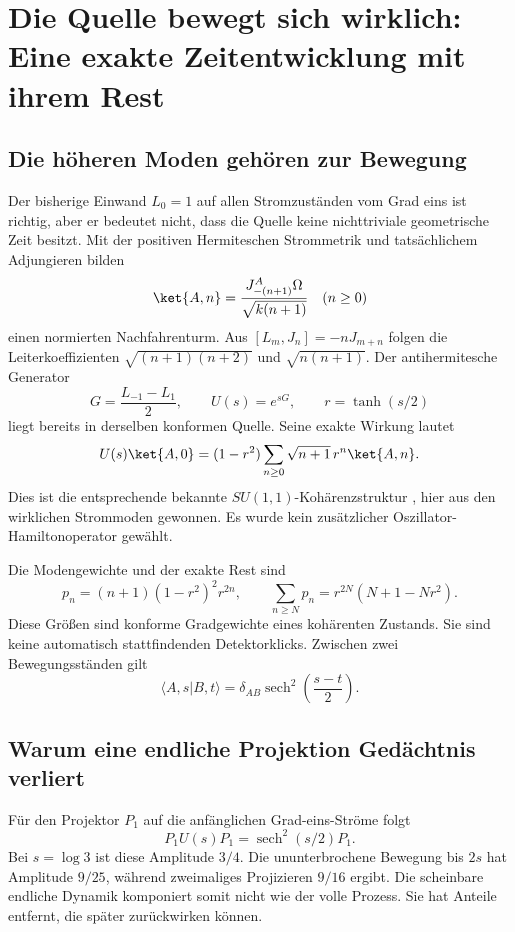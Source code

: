 \section{Die Quelle bewegt sich wirklich: Eine exakte Zeitentwicklung mit ihrem Rest}\label{sec:mobius}

\subsection{Die höheren Moden gehören zur Bewegung}
Der bisherige Einwand $L_0=1$ auf allen Stromzuständen vom Grad eins ist richtig, aber er bedeutet nicht, dass die Quelle keine nichttriviale geometrische Zeit besitzt. Mit der positiven Hermiteschen Strommetrik und tatsächlichem Adjungieren bilden
\begin{equation}
\ket{A,n}=\frac{J_{-(n+1)}^A\Omega}{\sqrt{k(n+1)}}\quad(n\ge0)
\end{equation}
einen normierten Nachfahrenturm. Aus $[L_m,J_n]=-nJ_{m+n}$ folgen die Leiterkoeffizienten $\sqrt{(n+1)(n+2)}$ und $\sqrt{n(n+1)}$. Der antihermitesche Generator
\begin{equation}
G=\frac{L_{-1}-L_1}{2},\qquad U(s)=e^{sG},\qquad r=\tanh(s/2)
\end{equation}
liegt bereits in derselben konformen Quelle. Seine exakte Wirkung lautet
\begin{equation}\label{eq:mobiustower}
U(s)\ket{A,0}=(1-r^2)\sum_{n\ge0}\sqrt{n+1}\,r^n\ket{A,n}.
\end{equation}
Dies ist die entsprechende bekannte $SU(1,1)$-Kohärenzstruktur \cite{perelomovstates}, hier aus den wirklichen Strommoden gewonnen. Es wurde kein zusätzlicher Oszillator-Hamiltonoperator gewählt.

Die Modengewichte und der exakte Rest sind
\begin{equation}
p_n=(n+1)(1-r^2)^2r^{2n},\qquad
\sum_{n\ge N}p_n=r^{2N}(N+1-Nr^2).
\end{equation}
Diese Größen sind konforme Gradgewichte eines kohärenten Zustands. Sie sind keine automatisch stattfindenden Detektorklicks. Zwischen zwei Bewegungsständen gilt
\begin{equation}
\langle A,s|B,t\rangle=\delta_{AB}\operatorname{sech}^2\!\left(\frac{s-t}{2}\right).
\end{equation}

\subsection{Warum eine endliche Projektion Gedächtnis verliert}
Für den Projektor $P_1$ auf die anfänglichen Grad-eins-Ströme folgt
\begin{equation}
P_1U(s)P_1=\operatorname{sech}^2(s/2)P_1.
\end{equation}
Bei $s=\log3$ ist diese Amplitude $3/4$. Die ununterbrochene Bewegung bis $2s$ hat Amplitude $9/25$, während zweimaliges Projizieren $9/16$ ergibt. Die scheinbare endliche Dynamik komponiert somit nicht wie der volle Prozess. Sie hat Anteile entfernt, die später zurückwirken können.

